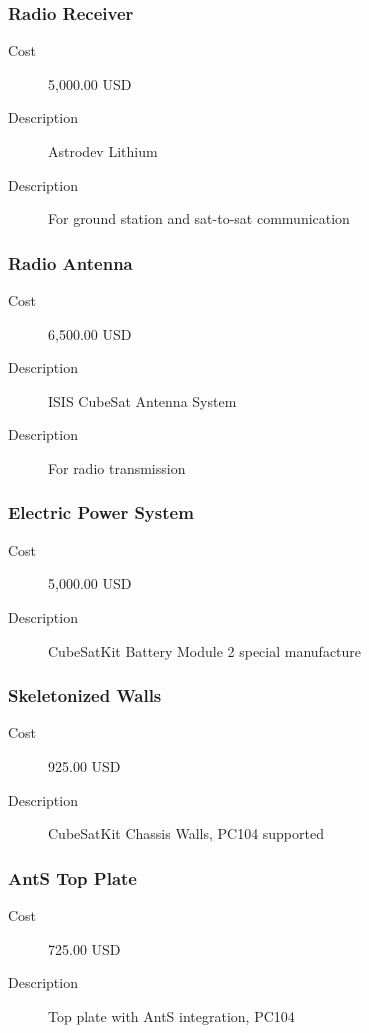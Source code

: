\subsubsection{Radio Receiver}
\begin{description}
\item[Cost] 5,000.00 USD
\item[Description] Astrodev Lithium
\item[Description] For ground station and sat-to-sat communication
\end{description}

\subsubsection{Radio Antenna}
\begin{description}
\item[Cost] 6,500.00 USD
\item[Description] ISIS CubeSat Antenna System
\item[Description] For radio transmission
\end{description}

\subsubsection{Electric Power System}
\begin{description}
\item[Cost] 5,000.00 USD
\item[Description] CubeSatKit Battery Module 2 special manufacture
\end{description}

\subsubsection{Skeletonized Walls}
\begin{description}
\item[Cost] 925.00 USD
\item[Description] CubeSatKit Chassis Walls, PC104 supported
\end{description}

\subsubsection{AntS Top Plate}
\begin{description}
\item[Cost] 725.00 USD
\item[Description] Top plate with AntS integration, PC104
\end{description}

